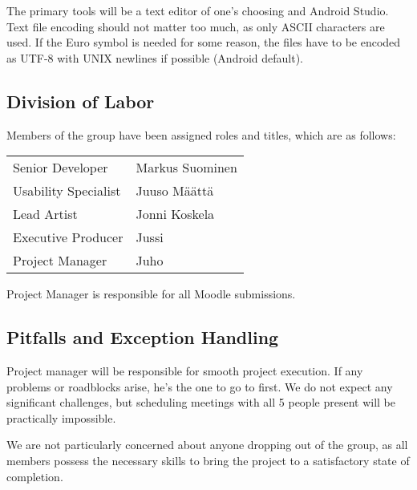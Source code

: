 \documentclass[english]{article}
\begin{document}
The primary tools will be a text editor of one's choosing and Android Studio.
Text file encoding should not matter too much, as only ASCII characters are
used. If the Euro symbol is needed for some reason, the files have to be
encoded as UTF-8 with UNIX newlines if possible (Android default).

\newpage
\subsection*{Division of Labor}
Members of the group have been assigned roles and titles, which are as follows:

\begin{tabular}{ p{18em} p{32em} }
Senior Developer & Markus Suominen\\
Usability Specialist & Juuso Määttä\\
Lead Artist & Jonni Koskela\\
Executive Producer & Jussi\\
Project Manager & Juho

\end{tabular}

Project Manager is responsible for all Moodle submissions.

\subsection*{Pitfalls and Exception Handling}
Project manager will be responsible for smooth project execution. If any
problems or roadblocks arise, he's the one to go to first. We do not expect
any significant challenges, but scheduling meetings with all 5 people present will
be practically impossible.

We are not particularly concerned about anyone dropping out of the group, as all
members possess the necessary skills to bring the project to a satisfactory state
of completion.
\end{document}
